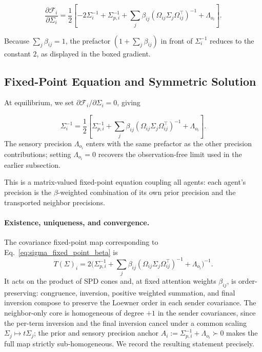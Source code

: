\documentclass[11pt]{article}
\begin{document}
\begin{equation}
\boxed{
\frac{\partial \mathcal{F}_i}{\partial \Sigma_i}
=\frac{1}{2}
\left[
-2 \Sigma_i^{-1}
+ \Sigma_{p,i}^{-1}
+ \sum_j \beta_{ij}
(\Omega_{ij}\Sigma_j\Omega_{ij}^\top)^{-1}
+ \Lambda_{o_i}
\right].
}
\end{equation}

Because $\sum_j \beta_{ij} = 1$, the prefactor $(1 + \sum_j \beta_{ij})$ in front of $\Sigma_i^{-1}$ reduces to the constant $2$, as displayed in the boxed gradient.

\subsection{Fixed-Point Equation and Symmetric Solution}

At equilibrium, we set $\partial \mathcal{F}_i / \partial \Sigma_i = 0$, giving

\begin{equation}
\Sigma_i^{-1}
=\frac{1}{2}
\left[
\Sigma_{p,i}^{-1}
+ \sum_j \beta_{ij}
(\Omega_{ij}\Sigma_j\Omega_{ij}^\top)^{-1}
+ \Lambda_{o_i}
\right].
\label{eq:sigma_fixed_point_beta}
\end{equation}
The sensory precision $\Lambda_{o_i}$ enters with the same prefactor as the other precision contributions; setting $\Lambda_{o_i} = 0$ recovers the observation-free limit used in the earlier subsection.

This is a matrix-valued fixed-point equation coupling all agents: each agent's precision is the $\beta$-weighted combination of its own prior precision and the transported neighbor precisions.

\paragraph{Existence, uniqueness, and convergence.} The covariance fixed-point map corresponding to Eq.~\eqref{eq:sigma_fixed_point_beta} is
\begin{equation}
T(\Sigma)_i = 2\big(\Sigma_{p,i}^{-1} + \sum_j \beta_{ij}(\Omega_{ij}\Sigma_j\Omega_{ij}^\top)^{-1} + \Lambda_{o_i}\big)^{-1}.
\label{eq:sigma_fixed_point_map}
\end{equation}
It acts on the product of SPD cones and, at fixed attention weights $\beta_{ij}$, is order-preserving: congruence, inversion, positive weighted summation, and final inversion compose to preserve the Loewner order in each sender covariance. The neighbor-only core is homogeneous of degree $+1$ in the sender covariances, since the per-term inversion and the final inversion cancel under a common scaling $\Sigma_j \mapsto t\Sigma_j$; the prior and sensory precision anchor $A_i := \Sigma_{p,i}^{-1} + \Lambda_{o_i} \succ 0$ makes the full map strictly sub-homogeneous. We record the resulting statement precisely.
\end{document}
